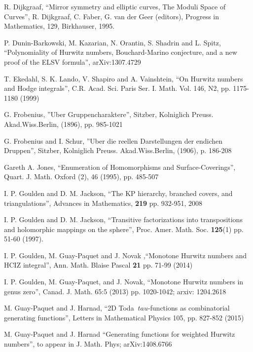 \documentclass[a4paper,10pt]{article}
\theoremstyle{plain}
\theoremstyle{remark}
\begin{document}
\begin{thebibliography}{99}
 R. Dijkgraaf, ``Mirror symmetry and elliptic curves, The Moduli Space
of Curves'', R. Dijkgraaf, C. Faber, G. van der Geer (editors), Progress
in Mathematics, 129, Birkhauser, 1995.

P. Dunin-Barkowski, M. Kazarian, N. Orantin, S. Shadrin and L. Spitz,
    ``Polynomiality of Hurwitz numbers, Bouchard-Marino conjecture, and a new proof of the ELSV formula'',
    arXiv:1307.4729
    
    
 T. Ekedahl, S. K. Lando, V. Shapiro and A. Vainshtein, ``On Hurwitz numbers and Hodge integrals'',
C.R. Acad. Sci. Paris Ser. I. Math. Vol. 146, N2, pp. 1175-1180 (1999)


 G. Frobenius, ''Uber Gruppencharaktere'', Sitzber, Kolniglich Preuss. Akad.Wiss.Berlin, (1896), pp. 985-1021

 G. Frobenius and I. Schur, ''Uber die reellen Darstellungen der endichen Druppen'', Sitzber, Kolniglich Preuss.
Akad.Wiss.Berlin, (1906), p. 186-208


 Gareth A. Jones, ``Enumeration of Homomorphisms and
Surface-Coverings'', Quart. J. Math. Oxford (2), 46 (1995), pp. 485-507

 I. P. Goulden and D. M. Jackson,
``The KP hierarchy, branched covers, and triangulations'',  Advances in Mathematics,
{\bf 219}  pp. 932-951, 2008

 I. P. Goulden and D. M. Jackson, ``Transitive factorizations into transpositions and holomorphic
mappings on the sphere'', {  Proc.  Amer. Math.  Soc.} {\bf 125}(1) pp. 51-60 (1997).

 I. P. Goulden, M. Guay-Paquet and J. Novak ,``Monotone Hurwitz numbers and HCIZ integral'',
Ann. Math. Blaise Pascal {\bf 21} pp. 71-99 (2014)


  I. P. Goulden, M. Guay-Paquet, and  J. Novak, ``Monotone Hurwitz numbers in genus zero'',
Canad. J. Math. 65:5 (2013) pp. 1020-1042; arxiv: 1204.2618

 M. Guay-Paquet and J. Harnad,
``2D Toda $\ tau $-functions as combinatorial generating functions'',
  Letters in Mathematical Physics 105, pp. 827-852 (2015)

 M. Guay-Paquet and J. Harnad
``Generating functions for weighted Hurwitz numbers'', to appear in J. Math. Phys; arXiv:1408.6766
  

\end{thebibliography}
\end{document}
